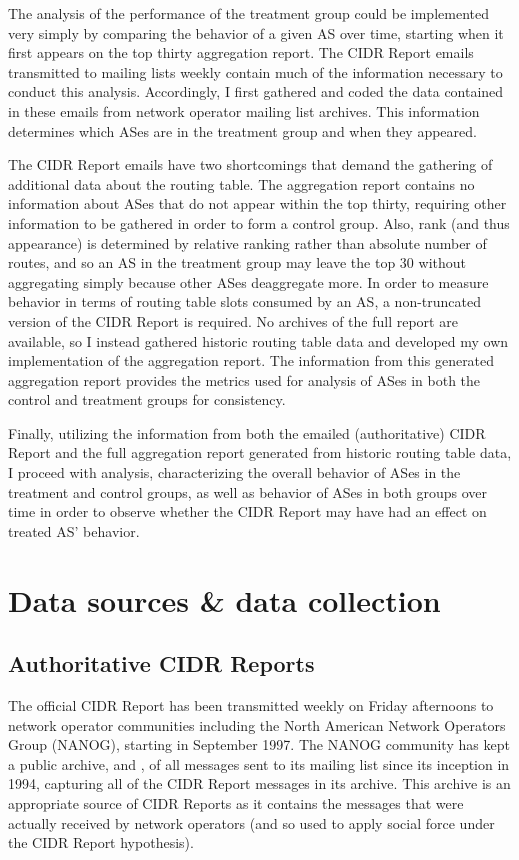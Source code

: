 The analysis of the performance of the treatment group could be implemented
very simply by comparing the behavior of a given AS over time, starting when it
first appears on the top thirty aggregation report. The CIDR Report emails
transmitted to mailing lists weekly contain much of the information necessary
to conduct this analysis. Accordingly, I first gathered and coded the data
contained in these emails from network operator mailing list archives. This
information determines which ASes are in the treatment group and when they
appeared.

The CIDR Report emails have two shortcomings that demand the gathering of
additional data about the routing table. The aggregation report contains no
information about ASes that do not appear within the top thirty, requiring
other information to be gathered in order to form a control group. Also, rank
(and thus appearance) is determined by relative ranking rather than absolute
number of routes, and so an AS in the treatment group may leave the top 30
without aggregating simply because other ASes deaggregate more. In order to
measure behavior in terms of routing table slots consumed by an AS, a
non-truncated version of the CIDR Report is required. No archives of the full
report are available, so I instead gathered historic routing table data and
developed my own implementation of the aggregation report. The information from
this generated aggregation report provides the metrics used for analysis of
ASes in both the control and treatment groups for consistency.

Finally, utilizing the information from both the emailed (authoritative) CIDR
Report and the full aggregation report generated from historic routing table
data, I proceed with analysis, characterizing the overall behavior of ASes in
the treatment and control groups, as well as behavior of ASes in both groups
over time in order to observe whether the CIDR Report may have had an effect on
treated AS' behavior.

\section{Data sources \& data collection} %

\subsection{Authoritative CIDR Reports}

The official CIDR Report has been transmitted weekly on Friday afternoons to
network operator communities including the North American Network Operators
Group (NANOG), starting in September 1997. The NANOG community has kept a
public archive, \cite{NANOG} and \cite{NANOG-new}, of all messages sent to its
mailing list since its inception in 1994, capturing all of the CIDR Report
messages in its archive. This archive is an appropriate source of CIDR Reports
as it contains the messages that were actually received by network operators
(and so used to apply social force under the CIDR Report hypothesis).

